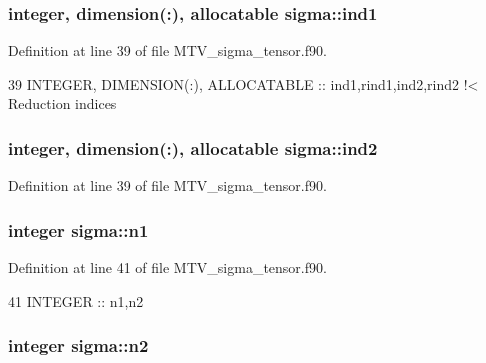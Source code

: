 \subsubsection[{\texorpdfstring{ind1}{ind1}}]{\setlength{\rightskip}{0pt plus 5cm}integer, dimension(\+:), allocatable sigma\+::ind1\hspace{0.3cm}{\ttfamily [private]}}\hypertarget{namespacesigma_a3f8dbbf3b119812ecc38f3e2cb0dcdf2}{}\label{namespacesigma_a3f8dbbf3b119812ecc38f3e2cb0dcdf2}


Definition at line 39 of file M\+T\+V\+\_\+sigma\+\_\+tensor.\+f90.


\begin{DoxyCode}
39   \textcolor{keywordtype}{INTEGER}, \textcolor{keywordtype}{DIMENSION(:)}, \textcolor{keywordtype}{ALLOCATABLE} :: ind1,rind1,ind2,rind2\textcolor{comment}{ !< Reduction indices}
\end{DoxyCode}
\subsubsection[{\texorpdfstring{ind2}{ind2}}]{\setlength{\rightskip}{0pt plus 5cm}integer, dimension(\+:), allocatable sigma\+::ind2\hspace{0.3cm}{\ttfamily [private]}}\hypertarget{namespacesigma_a5f8dd1d30a05aa1b77988cf43e9664bb}{}\label{namespacesigma_a5f8dd1d30a05aa1b77988cf43e9664bb}


Definition at line 39 of file M\+T\+V\+\_\+sigma\+\_\+tensor.\+f90.

\subsubsection[{\texorpdfstring{n1}{n1}}]{\setlength{\rightskip}{0pt plus 5cm}integer sigma\+::n1\hspace{0.3cm}{\ttfamily [private]}}\hypertarget{namespacesigma_a99bf91cd11d1a6d59216fceee65b9b4b}{}\label{namespacesigma_a99bf91cd11d1a6d59216fceee65b9b4b}


Definition at line 41 of file M\+T\+V\+\_\+sigma\+\_\+tensor.\+f90.


\begin{DoxyCode}
41   \textcolor{keywordtype}{INTEGER} :: n1,n2
\end{DoxyCode}
\subsubsection[{\texorpdfstring{n2}{n2}}]{\setlength{\rightskip}{0pt plus 5cm}integer sigma\+::n2\hspace{0.3cm}{\ttfamily [private]}}\hypertarget{namespacesigma_a4019bcd3294851992406e2f6a284413b}{}\label{namespacesigma_a4019bcd3294851992406e2f6a284413b}


